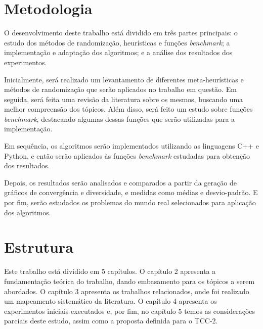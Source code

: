 \section{Metodologia}

O desenvolvimento deste trabalho está dividido em três partes principais: o estudo dos métodos de randomização, heurísticas e funções \textit{benchmark}; a implementação e adaptação dos algoritmos; e a análise dos resultados dos experimentos.

Inicialmente, será realizado um levantamento de diferentes meta-heurísticas e métodos de randomização que serão aplicados no trabalho em questão. Em seguida, será feita uma revisão da literatura sobre os mesmos, buscando uma melhor compreensão dos tópicos. Além disso, será feito um estudo sobre funções \textit{benchmark}, destacando algumas dessas funções que serão utilizadas para a implementação.

Em sequência, os algoritmos serão implementados utilizando as linguagens C++ e Python, e então serão aplicados às funções \textit{benchmark} estudadas para obtenção dos resultados.

Depois, os resultados serão analisados e comparados a partir da geração de gráficos de convergência e diversidade, e medidas como médias e desvio-padrão. E por fim, serão estudados os problemas do mundo real selecionados para aplicação dos algoritmos.

\section{Estrutura}

Este trabalho está dividido em 5 capítulos. O capítulo 2 apresenta a fundamentação teórica do trabalho, dando embasamento para os tópicos a serem abordados. O capítulo 3 apresenta os trabalhos relacionados, onde foi realizado um mapeamento sistemático da literatura. O capítulo 4 apresenta os experimentos iniciais executados e, por fim, no capítulo 5 temos as considerações parciais deste estudo, assim como a proposta definida para o TCC-2.


